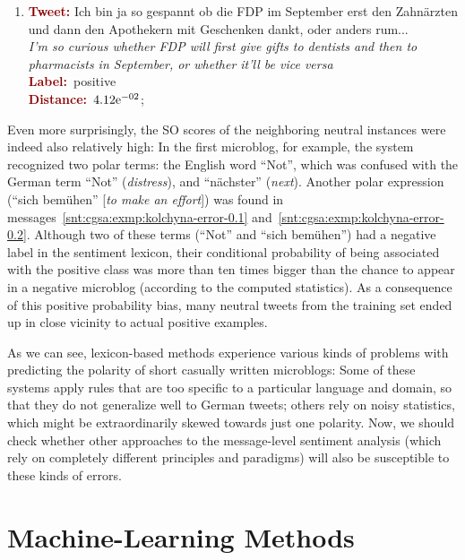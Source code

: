 \begin{enumerate}
\item \textcolor{darkred}{\bfseries Tweet:} Ich bin ja so gespannt ob
  die FDP im September erst den Zahn\"arzten und dann den Apothekern
  mit Geschenken dankt, oder anders rum...\\ \textit{I'm so curious
    whether FDP will first give gifts to dentists and then to
    pharmacists in September, or whether it'll be vice
    versa}\\ \textcolor{darkred}{\bfseries
    Label:}~\textcolor{green3}{positive}\\ \textcolor{darkred}{\bfseries
    Distance:}~${4.12}\mathrm{e}^{-02}$;
\end{enumerate}

\noindent Even more surprisingly, the SO scores of the neighboring
neutral instances were indeed also relatively high: In the first
microblog, for example, the system recognized two polar terms: the
English word ``Not'', which was confused with the German term ``Not''
(\emph{distress}), and ``n\"achster'' (\emph{next}).  Another polar
expression (``sich bem\"uhen'' [\emph{to make an effort}]) was found
in messages~\ref{snt:cgsa:exmp:kolchyna-error-0.1}
and~\ref{snt:cgsa:exmp:kolchyna-error-0.2}.  Although two of these
terms (``Not'' and ``sich bem\"uhen'') had a negative label in the
sentiment lexicon, their conditional probability of being associated
with the positive class was more than ten times bigger than the chance
to appear in a negative microblog (according to the computed
statistics). As a consequence of this positive probability bias, many
neutral tweets from the training set ended up in close vicinity to
actual positive examples.

As we can see, lexicon-based methods experience various kinds of
problems with predicting the polarity of short casually written
microblogs: Some of these systems apply rules that are too specific to
a particular language and domain, so that they do not generalize well
to German tweets; others rely on noisy statistics, which might be
extraordinarily skewed towards just one polarity.  Now, we should
check whether other approaches to the message-level sentiment analysis
(which rely on completely different principles and paradigms) will
also be susceptible to these kinds of errors.

\section{Machine-Learning Methods}\label{sec:cgsa:ml-based}


